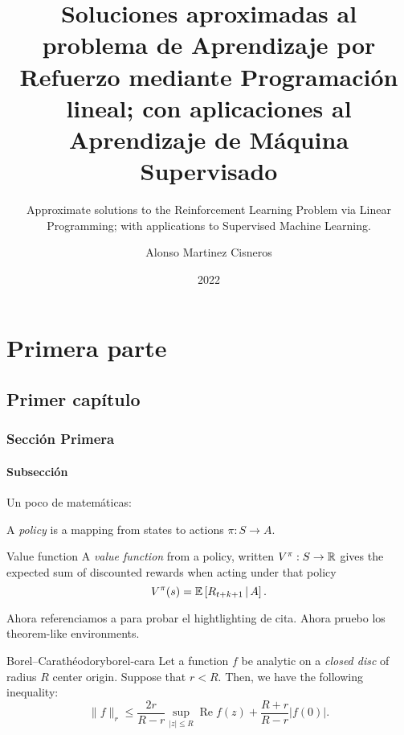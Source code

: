 \documentclass[colorful]{sty/itam-thesis}
\author{Alonso Martinez Cisneros}
\title{%
	Soluciones aproximadas al problema de Aprendizaje por Refuerzo mediante
	Programación lineal; con aplicaciones al Aprendizaje de Máquina Supervisado%
}
\subtitle{%
	Approximate solutions to the Reinforcement Learning Problem via Linear
	Programming; with applications to Supervised Machine Learning.%
}
\date{2022}
\begin{document}
\frontmatter
{}
\maketitle
\makefrontmatter



\tableofcontents

\mainmatter

\pagestyle{plain}

\part{Primera parte}
\chapter{Primer capítulo}

\section{Sección Primera}
\lipsum[1-2]

\subsection{Subsección}
Un poco de matemáticas:

A \emph{policy} is a mapping from states to actions $\pi: S \to A$.

\begin{dfn}{Value function}{}
	A \emph{value function} from a policy, written $V^{\pi}: S \to \mathbb{R}$ gives the
	expected sum of discounted rewards when acting under that policy
	\begin{equation}
		V^{\pi} (s) = \mathbb{E} \left[ R_{t+k+1} \,\middle\vert\, A \right].
	\end{equation}
\end{dfn}

Ahora referenciamos a \cite{farias2003LP2ADP} para probar el hightlighting de cita. Ahora pruebo 
los theorem-like environments.

\begin{thrm}{Borel--Carathéodory}{borel-cara}
Let a function $f$ be analytic on a \emph{closed disc} of radius $R$ center origin.
Suppose that $r < R$. Then, we have the following inequality:
\begin{equation}
\|f\|_r \le \frac{2r}{R-r} \sup_{|z| \le R} \operatorname{Re} f(z) + \frac{R+r}{R-r} 
|f(0)|.
\end{equation}
\end{thrm}
\end{document}
